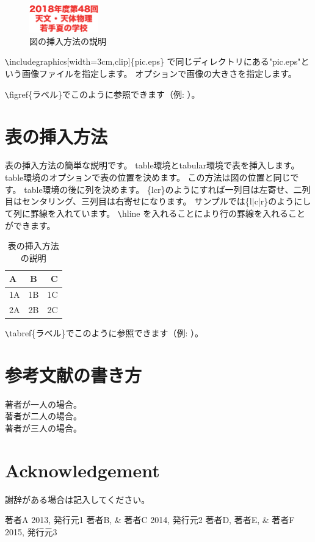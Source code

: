 \documentclass[a4paper,10pt,oneside,twocolumn,notitlepage,final]{jarticle}
\begin{document}
\begin{figure}[htbp]
 \centering
 \includegraphics[width=3cm,clip]{pic.eps}
 \caption{図の挿入方法の説明}
 \label{pic} %
\end{figure}

\verb+\+includegraphics[width=3cm,clip]\{pic.eps\}
で同じディレクトリにある"pic.eps"という画像ファイルを指定します。
オプションで画像の大きさを指定します。

\verb+\+figref\{ラベル\}でこのように参照できます（例: ）。

\section{表の挿入方法}
表の挿入方法の簡単な説明です。
table環境とtabular環境で表を挿入します。
table環境のオプションで表の位置を決めます。
この方法は図の位置と同じです。
table環境の後に列を決めます。
\{lcr\}のようにすれば一列目は左寄せ、二列目はセンタリング、三列目は右寄せになります。
サンプルでは\{l|c|r\}のようにして列に罫線を入れています。
\verb+\+hline を入れることにより行の罫線を入れることができます。

\begin{table}[htb]
 \caption{表の挿入方法の説明}
  \centering
   \begin{tabular}{|l|c|r|} \hline
     A & B & C  \\ \hline
     1A & 1B & 1C  \\
     2A & 2B & 2C  \\ \hline
   \end{tabular}
  \label{table}%
\end{table}

\verb+\+tabref\{ラベル\}でこのように参照できます（例: ）。

\section{参考文献の書き方}
\noindent
著者が一人の場合\citep{ラベル1}。\\
著者が二人の場合\citep{ラベル2}。\\
著者が三人の場合\citep{ラベル3}。\\
\section*{Acknowledgement}
謝辞がある場合は記入してください。

\small
\begin{thebibliography}{99}
 著者A 2013, 発行元1
 著者B, \& 著者C 2014,  発行元2
 著者D, 著者E, \& 著者F 2015, 発行元3
 
 
\end{thebibliography}
\end{document}
